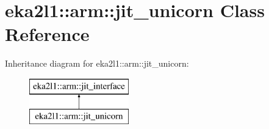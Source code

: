 \hypertarget{classeka2l1_1_1arm_1_1jit__unicorn}{}\section{eka2l1\+:\+:arm\+:\+:jit\+\_\+unicorn Class Reference}
\label{classeka2l1_1_1arm_1_1jit__unicorn}
Inheritance diagram for eka2l1\+:\+:arm\+:\+:jit\+\_\+unicorn\+:\begin{figure}[H]
\begin{center}
\leavevmode
\includegraphics[height=2.000000cm]{classeka2l1_1_1arm_1_1jit__unicorn}
\end{center}
\end{figure}

